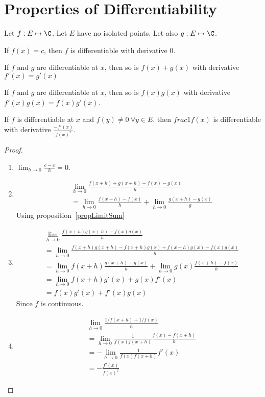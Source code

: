 \documentclass[../Main.tex]{subfiles}
\begin{document}
\section{Properties of Differentiability}
\begin{propositions}{
        Let $f : E \mapsto \C$. Let $E$ have no isolated points. Let also $g : E \mapsto \C$.
        \label{propsDiffProperties}
    }
    \item If $f(x) = c$, then $f$ is differentiable with derivative 0. \label{propConstantDiffability}    
    \item If $f$ and $g$ are differentiable at $x$, then so is $f(x) + g(x)$ with derivative $f'(x) = g'(x)$ \label{propSumDiffability}
    \item If $f$ and $g$ are differentiable at $x$, then so is $f(x)g(x)$ with derivative $f'(x) g(x) = f(x) g'(x)$. \label{propProdDiffability}
    \item If $f$ is differentiable at $x$ and $f(y) \neq 0~\forall y \in E$, then $frac{1}{f(x)}$ is differentiable with derivative $\frac{-f'(x)}{f(x)^2}$. \label{propReciprocalDiffability}
\end{propositions}
\begin{proof}
    \begin{enumerate}
        \item $\lim_{h \to 0} \frac{c - c}{h} = 0$.
        \item
            \begin{align*}
                &\lim_{h \to 0} \frac{f(x + h) + g(x + h) - f(x) - g(x)}{h} \\
                &= \lim_{h \to 0} \frac{f(x + h) - f(x)}{h} + \lim_{h \to 0} \frac{g(x + h) - g(x)}{g}
            \end{align*}
            Using proposition~\ref{propLimitSum}
        \item 
            \begin{align*}
                &\lim_{h \to 0} \frac{f(x + h)g(x + h) - f(x) g(x)}{h} \\
                &= \lim_{h \to 0} \frac{f(x + h) g(x + h) - f(x + h) g(x) + f(x + h) g(x) - f(x) g(x)}{h} \\
                &= \lim_{h \to 0} f(x + h) \frac{g(x + h) - g(x)}{h} + \lim_{h \to 0} g(x) \frac{f(x + h) - f(x)}{h} \\
                &= \lim_{h \to 0} f(x + h) g'(x) + g(x) f'(x) \\
                &= f(x) g'(x) + f'(x) g(x)
            \end{align*}
            Since $f$ is continuous.
        \item 
            \begin{align*}
                &\lim_{h \to 0} \frac{1/f(x + h) + 1/f(x)}{h} \\
                &= \lim_{h \to 0} \frac{1}{f(x) f(x + h)} \frac{f(x) - f(x + h)}{h} \\
                &= -\lim_{h \to 0} \frac{1}{f(x) f(x + h)} f'(x) \\
                &= -\frac{f'(x)}{f(x)^2}
            \end{align*}
    \end{enumerate}
\end{proof}
\end{document}
